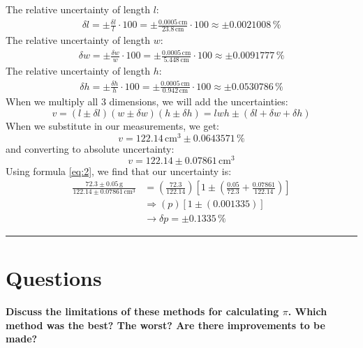 \documentclass{article}
\begin{document}
\noindent The relative uncertainty of length $l$:
\begin{align*}
    \delta l = \pm\frac{\delta l}{l} \cdot 100 = \pm\frac{0.0005 \,\mathrm{cm}}{23.8 \,\mathrm{cm}} \cdot 100 \approx \pm0.0021008\,\% 
\end{align*}
The relative uncertainty of length $w$:
\begin{align*}
    \delta w = \pm\frac{\delta w}{w} \cdot 100 = \pm\frac{0.0005 \,\mathrm{cm}}{5.448 \,\mathrm{cm}} \cdot 100 \approx \pm0.0091777\,\% 
\end{align*}
The relative uncertainty of length $h$:
\begin{align*}
    \delta h = \pm\frac{\delta h}{h} \cdot 100 = \pm\frac{0.0005 \,\mathrm{cm}}{0.942 \,\mathrm{cm}} \cdot 100 \approx \pm0.0530786\,\% 
\end{align*}
When we multiply all 3 dimensions, we will add the uncertainties:
\[ v = (l\pm\delta l)(w\pm\delta w)(h\pm\delta h) = lwh\pm(\delta l + \delta w + \delta h) \]
When we substitute in our measurements, we get:
\[ v = 122.14 \,\mathrm{cm}^3 \pm 0.0643571\,\% \]
and converting to absolute uncertainty:
\[ v = 122.14 \pm 0.07861 \,\mathrm{cm}^3 \]
Using formula \eqref{eq:2}, we find that our uncertainty is:
\begin{align*}
    \frac{72.3\pm0.05\,\mathrm{g}}{122.14\pm0.07861\,\mathrm{cm}^3} 
&= \left(\frac{72.3}{122.14}\right)\left[1\pm\left(\frac{0.05}{72.3}+\frac{0.07861}{122.14}\right)\right]
\\ &\Rightarrow (p)\left[1\pm(0.001335)\right]
\\ &\rightarrow \boxed{\delta p = \pm 0.1335\,\%}
\end{align*}

\vspace{1em}
\hrule

\section{Questions}

\newcommand{\numberQ}{\quad} %

\paragraph*{\numberQ Discuss the limitations of these 
methods for calculating $\pi$. Which method was 
the best? The worst? Are there improvements to be made?}
\end{document}
